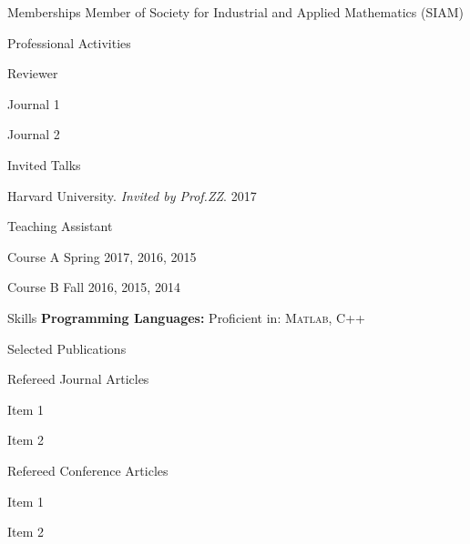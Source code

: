 \documentclass[10pt,a4paper]{resume}
\newcommand{\wtspace}{\hspace{1mm}}
\begin{document}
\begin{rMember}{Memberships}
\noindent
 \sbull Member of Society for Industrial and Applied Mathematics (SIAM)
\end{rMember}
\begin{rSection}{Professional Activities}
	\begin{rSubsection}{Reviewer}{}{}{} 
		\vspace{-3mm}
		\begin{multicols}{2}
		\item Journal 1
		\item Journal 2
	\end{multicols}
\vspace{-6mm}
	\end{rSubsection} 
\begin{rSubsection}{Invited Talks}{}{}{} 
	\item {{Harvard University}}. \textit{Invited by Prof.\wtspace ZZ}. \hfill {2017} 
\end{rSubsection} 
\vspace{-2mm}
\begin{rSubsection}{Teaching Assistant}{}{}{} 
	\item Course A \hfill {Spring 2017, 2016, 2015}
	\item Course B \hfill {Fall 2016, 2015, 2014}
\end{rSubsection} 
\vspace{-2mm}
\end{rSection}

\vspace{-3.5mm}
\begin{rSection}{Skills}
	\hspace{-6mm}
	\noindent\sbull \textbf{Programming Languages:} Proficient in: \textsc{Matlab}, C++
\end{rSection}

\begin{rPublication}{Selected Publications}
\begin{rSubpublication}{Refereed Journal Articles}{}{}{} 
	\begin{etaremune}
	\item Item 1
	\item Item 2
	\end{etaremune}
\end{rSubpublication} 	

\begin{rSubpublication}{Refereed Conference Articles}{}{}{} 
	\begin{etaremune}
		\item Item 1
	\item Item 2
	\end{etaremune}
\end{rSubpublication} 	
\end{rPublication}
\end{document}
